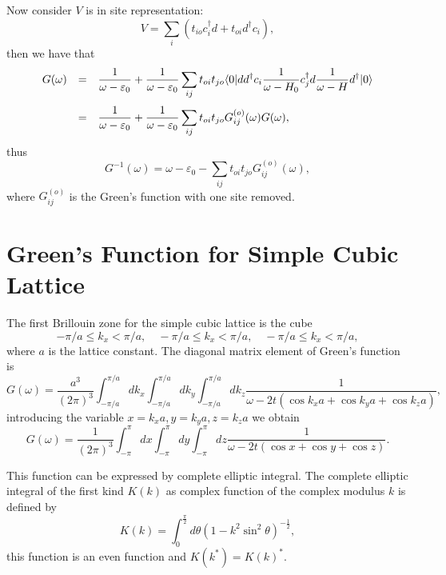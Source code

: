 \documentclass{book}
\newcommand{\bra}[1]{{\langle#1|}}
\newcommand{\ket}[1]{{|#1\rangle}}
\numberwithin{equation}{section}
\begin{document}
Now consider $V$ is in site representation:
\begin{equation}
  V=\sum_{i}(t_{io}c_i^\dag d+t_{oi}d^\dag c_i),
\end{equation}
then we have that
\begin{equation}
  \begin{array}{rcl}
    G(\omega) &=& \displaystyle\frac{1}{\omega-\varepsilon_0}
    +\frac{1}{\omega-\varepsilon_0}\sum_{ij}t_{oi}t_{jo}\bra{0}dd^\dag c_i
    \frac{1}{\omega-H_0}c_j^\dag
    d\frac{1}{\omega-H}d^\dag\ket{0}\\\vbox to 20pt{}
    &=&\displaystyle\frac{1}{\omega-\varepsilon_0}
    +\frac{1}{\omega-\varepsilon_0}\sum_{ij}t_{oi}t_{jo}
    G_{ij}^{(o)}(\omega)G(\omega),\\
  \end{array}
\end{equation}
thus
\begin{equation}
  G^{-1}(\omega)=\omega-\varepsilon_0-\sum_{ij}t_{oi}t_{jo}G^{(o)}_{ij}(\omega),
\end{equation}
where $G^{(o)}_{ij}$ is the Green's function with one site removed.

\section{Green's Function for Simple Cubic Lattice}
The first Brillouin zone for the simple cubic lattice is the cube
\begin{equation}
  -\pi/a\le k_x<\pi/a,\quad-\pi/a\le k_x<\pi/a, \quad-\pi/a\le k_x<\pi/a,
\end{equation}
where $a$ is the lattice constant. The diagonal matrix element of
Green's function is
\begin{equation}
  G(\omega)=\frac{a^3}{(2\pi)^3}\int_{-\pi/a}^{\pi/a}dk_x
  \int_{-\pi/a}^{\pi/a}dk_y\int_{-\pi/a}^{\pi/a}dk_z
  \frac{1}{\omega-2t(\cos k_xa+\cos k_ya+\cos k_za)},
\end{equation}
introducing the variable $x=k_xa,y=k_ya,z=k_za$ we obtain
\begin{equation}
  G(\omega)=\frac{1}{(2\pi)^3}\int_{-\pi}^\pi dx\int_{-\pi}^\pi dy
  \int_{-\pi}^\pi dz
  \frac{1}{\omega-2t(\cos x+\cos y+\cos z)}.
  \label{simple-cubic-green-function}
\end{equation}

This function can be expressed by complete elliptic integral. The
complete elliptic integral of the first kind $K(k)$ as complex
function of the complex modulus $k$ is defined by
\begin{equation}
  K(k)=\int_0^{\frac{\pi}{2}}d\theta(1-k^2\sin^2\theta)^{-\frac{1}{2}},
\end{equation}
this function is an even function and $K(k^*)=K(k)^*$.
\end{document}
